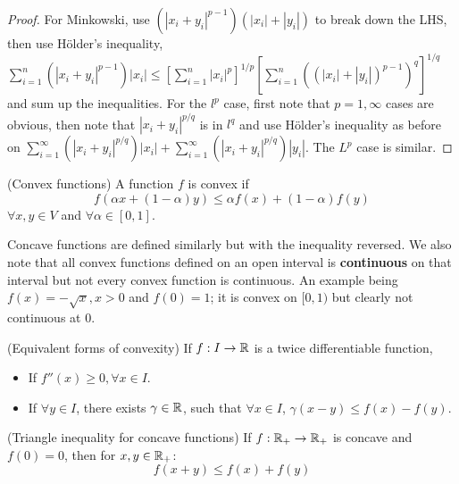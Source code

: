 \begin{cor}
\begin{proof}
        For Minkowski, use $(|x_i+y_i|^{p-1})(|x_i|+|y_i|)$ to break down the LHS, then use Hölder's inequality,
        $\sum_{i=1}^n (|x_i+y_i|^{p-1})|x_i| \leq \left[ \sum_{i=1}^n |x_i|^p\right]^{1/p}
        \left[ \sum_{i=1}^n ((|x_i|+|y_i|)^{p-1})^q\right]^{1/q}$ and sum up the inequalities.   
        For the $l^p$ case, first note that $p=1,\infty$ cases are obvious, then note
        that $|x_i+y_i|^{p/q}$ is in $l^q$ and use Hölder's inequality as before on 
        $\sum_{i=1}^{\infty} (|x_i+y_i|^{p/q})|x_i|+\sum_{i=1}^{\infty} (|x_i+y_i|^{p/q})|y_i|$.  
        The $L^p$ case is similar.  
    \end{proof}
\end{cor}

\begin{defn}
    (Convex functions) A function $f$ is convex if 
    \begin{equation*}
        f(\alpha x + (1-\alpha)y) \leq \alpha f(x) + (1-\alpha)f(y)
    \end{equation*}
    $\forall x,y \in V$ and $\forall \alpha \in [0,1]$.
\end{defn}

Concave functions are defined similarly but with the inequality reversed. We also note that all convex functions defined
on an open interval is \textbf{continuous} on that interval but not every convex function is continuous. An example being
$f(x) = - \sqrt{x}, x>0$ and $f(0)=1$; it is convex on $[0,1)$ but clearly not continuous at $0$.

\begin{prop}
    (Equivalent forms of convexity) If $f: I \to \mathbb{R}$ is a twice differentiable function,  
    \begin{itemize}
        \item If $f''(x)\geq 0, \forall x \in I$.
        \item If $\forall y \in I$, there exists $\gamma \in \mathbb{R}$, such that $\forall x \in I$, 
                $\gamma (x-y) \leq f(x)-f(y)$.
    \end{itemize}
\end{prop}


\begin{prop}
    (Triangle inequality for concave functions)  
    If $f: \mathbb{R}_+ \to \mathbb{R}_+$ is concave and $f(0)=0$, then for $x,y \in \mathbb{R}_+$:
    \begin{equation*}
        f(x+y) \leq f(x) + f(y)
    \end{equation*}
\end{prop}

